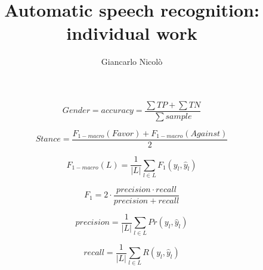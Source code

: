 \documentclass[]{article}
\title{Automatic speech recognition: individual work}
\author{Giancarlo Nicolò}
\date{}
\begin{document}
\begin{equation}
Gender = accuracy = \frac{\sum TP + \sum TN}{\sum sample}
\end{equation}

\begin{equation}
Stance = \frac{F_{1-macro}(Favor) + F_{1-macro}(Against)}{2}
\end{equation}

\begin{equation}
F_{1-macro}(L) = \frac{1}{|L|} \displaystyle\sum_{l\in L} F_1(y_l, \hat{y}_l)
\end{equation}

\begin{equation}
F_1 = 2 \cdot \frac{precision \cdot recall }{precision + recall}
\end{equation}

\begin{equation}
precision = \frac{1}{|L|} \displaystyle\sum_{l\in L} Pr(y_l, \hat{y}_l)
\end{equation}

\begin{equation}
recall = \frac{1}{|L|} \displaystyle\sum_{l\in L} R(y_l, \hat{y}_l)
\end{equation}
\end{document}

